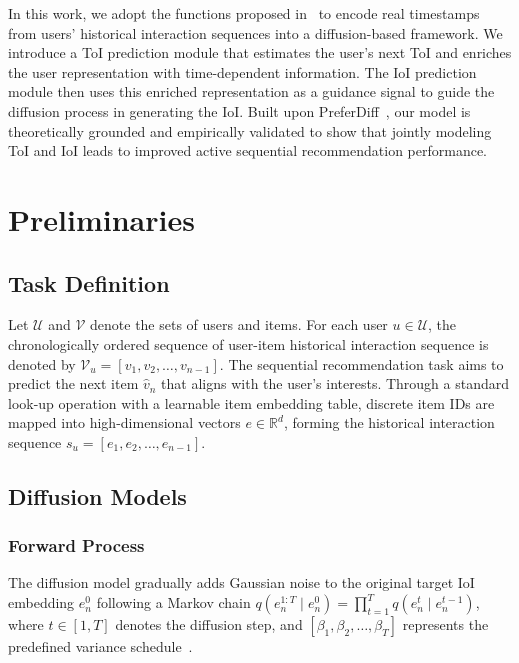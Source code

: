 \documentclass[sigconf,nonacm]{acmart}
\begin{document}
In this work, we adopt the functions proposed in~\cite{zheng2021rethinking} to encode real timestamps from users' historical interaction sequences into a diffusion-based framework. We introduce a ToI prediction module that estimates the user's next ToI and enriches the user representation with time-dependent information. The IoI prediction module then uses this enriched representation as a guidance signal to guide the diffusion process in generating the IoI. Built upon PreferDiff~\cite{liu2024preference}, our model is theoretically grounded and empirically validated to show that jointly modeling ToI and IoI leads to improved active sequential recommendation performance.

\section{Preliminaries}
\subsection{Task Definition}
Let $\mathcal{U}$ and $\mathcal{V}$ denote the sets of users and items. For each user $u \in \mathcal{U}$, the chronologically ordered sequence of user-item historical interaction sequence is denoted by \(\mathcal{V}_u = [v_1, v_2, \dots, v_{n-1}]\). The sequential recommendation task aims to predict the next item \(\hat{v}_{n}\) that aligns with the user's interests. Through a standard look-up operation with a learnable item embedding table, discrete item IDs are mapped into high-dimensional vectors \( {e} \in \mathbb{R}^{d} \), forming the historical interaction sequence \( {s}_u = [{e}_1, {e}_2, \dots, {e}_{n-1}] \).

\subsection{Diffusion Models}
\subsubsection{Forward Process}
\label{subsubsec:Forward}
The diffusion model gradually adds Gaussian noise to the original target IoI embedding \( e_{n}^{0} \) following a Markov chain \( q(e_{n}^{1:T} \mid e_{n}^{0}) = \prod_{t=1}^{T} q(e_{n}^{t} \mid e_{n}^{t-1}) \), where \( t \in [1, T] \) denotes the diffusion step, and \( [\beta_1, \beta_2, \dots, \beta_T] \) represents the predefined variance schedule~\cite{ho2020denoising}. 
\end{document}
